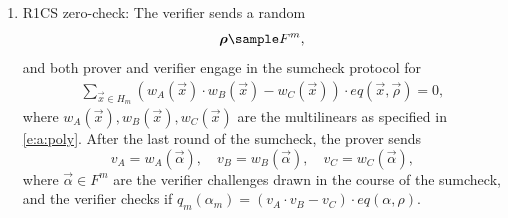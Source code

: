 \begin{protocol}
\begin{enumerate}
\item 
\label{i:main:phase:2}
R1CS zero-check:
The verifier sends a random 
\[
\vec\rho \sample F^m,
\]
and both prover and verifier engage in the sumcheck protocol for %
\begin{align}
\label{e:R1CS:zerocheck}
\sum_{\vec x\in H_m} \left(w_A(\vec x)\cdot w_B(\vec x) - w_C(\vec x)\right)\cdot eq(\vec x, \vec\rho) = 0,
\end{align}
where $w_A(\vec x), w_B(\vec x), w_C(\vec x)$ are the multilinears as specified in \eqref{e:a:poly}.
After the last round of the sumcheck, the prover sends 
\begin{equation*}
v_A = w_A(\vec\alpha),  \quad v_B = w_B(\vec\alpha), \quad v_C = w_C(\vec\alpha),
\end{equation*}
where $\vec\alpha \in F^m$ are the verifier challenges drawn in the course of the sumcheck, and the verifier checks if 
$q_m(\alpha_m) = (v_A\cdot v_B - v_C) \cdot eq(\alpha,\rho)$.


\end{enumerate}
\end{protocol}
